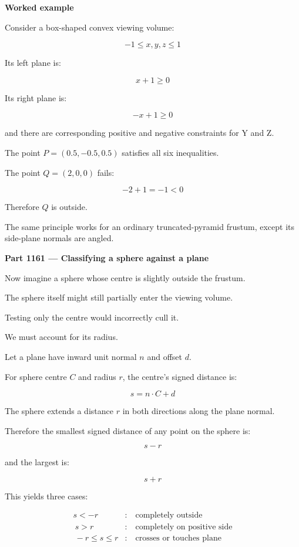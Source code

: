 \textbf{Worked example}

Consider a box-shaped convex viewing volume:

\[
-1\le x,y,z\le1
\]

Its left plane is:

\[
x+1\ge0
\]

Its right plane is:

\[
-x+1\ge0
\]

and there are corresponding positive and negative constraints for Y and Z.

The point \(P=(0.5,-0.5,0.5)\) satisfies all six inequalities.

The point \(Q=(2,0,0)\) fails:

\[
-2+1=-1<0
\]

Therefore \(Q\) is outside.

The same principle works for an ordinary truncated-pyramid frustum, except its side-plane normals are angled.

\textbf{Part 1161 --- Classifying a sphere against a plane}

Now imagine a sphere whose centre is slightly outside the frustum.

The sphere itself might still partially enter the viewing volume.

Testing only the centre would incorrectly cull it.

We must account for its radius.

Let a plane have inward unit normal \(n\) and offset \(d\).

For sphere centre \(C\) and radius \(r\), the centre's signed distance is:

\[
s=n\cdot C+d
\]

The sphere extends a distance \(r\) in both directions along the plane normal.

Therefore the smallest signed distance of any point on the sphere is:

\[
s-r
\]

and the largest is:

\[
s+r
\]

This yields three cases:

\[
\boxed{ \begin{aligned} s<-r&:\quad\text{completely outside}\\\ s>r&:\quad\text{completely on positive side}\\\ -r\le s\le r&:\quad\text{crosses or touches plane} \end{aligned} }
\]


